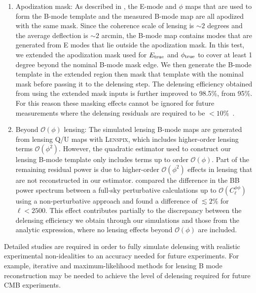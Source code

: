 \begin{enumerate}[leftmargin=0.5cm]
	\item{Apodization mask:
        As described in , the E-mode and $\phi$ maps that are used to form the B-mode template and the measured B-mode map are all apodized with the same mask.
	Since the coherence scale of lensing is $\sim 2$ degrees and the average deflection is $\sim 2$ arcmin, the B-mode map contains modes that are generated from E modes that lie outside the apodization mask.
	In this test, we extended the apodization mask used for $E_{\rm true}$ and $\phi_{\rm true}$ to cover at least 1 degree beyond the nominal B-mode mask edge.
	We then generate the B-mode template in the extended region then mask that template with the nominal mask before passing it to the delensing step.
	The delensing efficiency obtained from using the extended mask inputs is further improved to 98.5\%, from 95\%.
        For this reason these masking effects cannot be ignored for future measurements where the delensing residuals are required to be $<10\%$~\citep[e.g.][]{cmbs4scibk}.
	 }
	\item{Beyond $\mathcal{O}(\phi)$ lensing:
          The simulated lensing B-mode maps are generated from lensing Q/U maps with \textsc{Lenspix}, which includes higher-order lensing terms $\mathcal{O}(\phi^2)$.
	However, the quadratic estimator used to construct our lensing B-mode template only includes terms up to order $\mathcal{O}(\phi)$.
	Part of the remaining residual power is due to higher-order $\mathcal{O}(\phi^2)$ effects in lensing that are not reconstructed in our estimator.
	\cite{2005PhRvD..71j3010C} compared the difference in the BB power spectrum between a full-sky perturbative calculations up to $\mathcal{O}(C_{\ell}^{\phi \phi})$ using a non-perturbative approach and found a difference of $\lesssim2\%$ for $\ell < 2500$.
	This effect contributes partially to the discrepancy between the delensing efficiency we obtain through our simulations and those from the analytic expression, where no lensing effects beyond $\mathcal{O}(\phi)$ are included.
	}

\end{enumerate}

Detailed studies are required in order to fully simulate delensing with realistic experimental non-idealities to an accuracy needed for future experiments.
For example, iterative and maximum-likelihood methods for lensing B mode reconstruction may be needed to achieve the level of delensing required for future CMB experiments.


